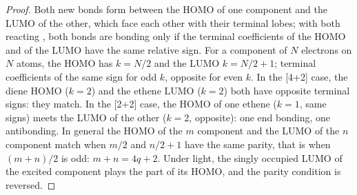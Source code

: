 \begin{proof}
Both new bonds form between the HOMO of one component and the LUMO of the
other, which face each other with their terminal lobes; with both reacting
, both bonds are bonding only if the terminal coefficients of the
HOMO and of the LUMO have the same relative sign. For a component of $N$
electrons on $N$ atoms, the HOMO has $k = N/2$ and the LUMO $k = N/2 + 1$; terminal coefficients of the
same sign for odd $k$, opposite for even $k$. In the [4+2] case, the diene HOMO ($k = 2$)
and the ethene LUMO ($k = 2$) both have opposite terminal signs: they match. In the
[2+2] case, the HOMO of one ethene ($k = 1$, same signs) meets the LUMO of the other
($k = 2$, opposite): one end bonding, one antibonding. In general the HOMO of the $m$
component and the LUMO of the $n$ component match when $m/2$ and $n/2 + 1$ have the same
parity, that is when $(m + n)/2$ is odd: $m + n = 4q + 2$. Under light, the singly occupied LUMO of
the excited component plays the part of its HOMO, and the parity condition is
reversed.
\end{proof}


